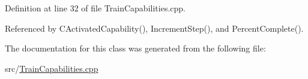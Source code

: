 Definition at line 32 of file Train\+Capabilities.\+cpp.



Referenced by C\+Activated\+Capability(), Increment\+Step(), and Percent\+Complete().



The documentation for this class was generated from the following file\+:\begin{DoxyCompactItemize}
\item 
src/\hyperlink{TrainCapabilities_8cpp}{Train\+Capabilities.\+cpp}\end{DoxyCompactItemize}
